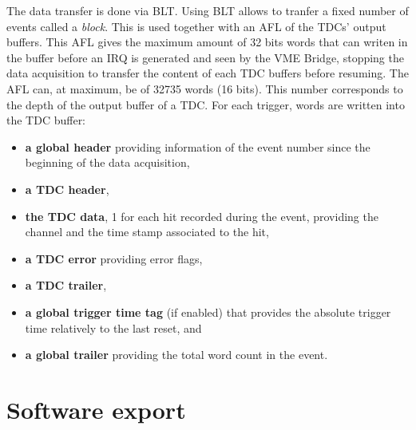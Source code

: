 	The data transfer is done via \acf{BLT}. Using BLT allows to tranfer a fixed number of events called a \textit{block}. This is used together with an \acf{AFL} of the TDCs' output buffers. This AFL gives the maximum amount of 32 bits words that can writen in the buffer before an \acf{IRQ} is generated and seen by the VME Bridge, stopping the data acquisition to transfer the content of each TDC buffers before resuming. The AFL can, at maximum, be of 32735 words (16 bits). This number corresponds to the depth of the output buffer of a TDC. For each trigger, words are written into the TDC buffer:
	
	\begin{itemize}
		\item \textbf{a global header} providing information of the event number since the beginning of the data acquisition,
		\item \textbf{a TDC header},
		\item \textbf{the TDC data}, 1 for each hit recorded during the event, providing the channel and the time stamp associated to the hit,
		\item \textbf{a TDC error} providing error flags,
		\item \textbf{a TDC trailer},
		\item \textbf{a global trigger time tag} (if enabled) that provides the absolute trigger time relatively to the last reset, and
		\item \textbf{a global trailer} providing the total word count in the event.
	\end{itemize}

\section{Software export}


\clearpage{\pagestyle{empty}\cleardoublepage}

